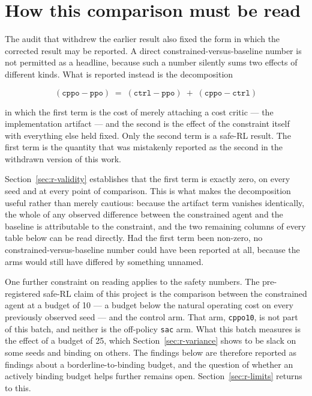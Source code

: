 
\section{How this comparison must be read}\label{sec:r-reading}

The audit that withdrew the earlier result also fixed the form in which the corrected result may
be reported. A direct constrained-versus-baseline number is not permitted as a headline, because
such a number silently sums two effects of different kinds. What is reported instead is the
decomposition

\begin{equation}
  (\mathtt{cppo} - \mathtt{ppo}) \;=\; (\mathtt{ctrl} - \mathtt{ppo}) \;+\; (\mathtt{cppo} - \mathtt{ctrl})
  \label{eq:decomposition}
\end{equation}

in which the first term is the cost of merely attaching a cost critic --- the implementation
artifact --- and the second is the effect of the constraint itself with everything else held fixed.
Only the second term is a safe-RL result. The first term is the quantity that was
mistakenly reported as the second in the withdrawn version of this work.

Section~\ref{sec:r-validity} establishes that the first term is exactly zero, on every seed and at every point of
comparison. This is what makes the decomposition useful rather than merely cautious: because the
artifact term vanishes identically, the whole of any observed difference between the constrained
agent and the baseline is attributable to the constraint, and the two remaining columns of every
table below can be read directly. Had the first term been non-zero, no constrained-versus-baseline
number could have been reported at all, because the arms would still have differed by something
unnamed.

One further constraint on reading applies to the safety numbers. The pre-registered safe-RL claim
of this project is the comparison between the constrained agent at a budget of 10 --- a budget below
the natural operating cost on every previously observed seed --- and the control arm. That arm,
\texttt{cppo10}, is not part of this batch, and neither is the off-policy \texttt{sac} arm. What this batch
measures is the effect of a budget of 25, which Section~\ref{sec:r-variance} shows to be slack on some seeds and
binding on others. The findings below are therefore reported as findings about a
borderline-to-binding budget, and the question of whether an actively binding budget helps further
remains open. Section~\ref{sec:r-limits} returns to this.

